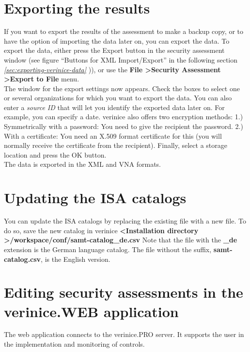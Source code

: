 \documentclass[a4paper,10pt]{book}
\begin{document}
\section{Exporting the results}
If you want to export the results of the assessment to make a backup copy, or to have the option of
importing the data later on, you can export the data. To export the data, either press the Export button
in the security assessment window (see figure ``Buttons for XML Import/Export'' in the following section {\em \ref{sec:exporting-verinice-data} })),
or use the \textbf{File \textgreater Security Assessment \textgreater Export to File} menu.
\newline\\
The window for the export settings now appears. Check the boxes to select one or several organizations
for which you want to export the data. You can also enter a \textit{source ID} that will let you identify the
exported data later on. For example, you can specify a date. verinice also offers two encryption methods: 1.)
Symmetrically with a password: You need to give the recipient the password. 2.) With a certificate: You
need an X.509 format certificate for this (you will normally receive the certificate from the recipient).
Finally, select a storage location and press the OK button.
\newline\\
The data is exported in the XML and VNA formats.

\section{Updating the ISA catalogs}
You can update the ISA catalogs by replacing the existing file with a new file. To do so, save the new catalog in verinice
\textbf{\textless Installation directory \textgreater/workspace/conf/samt-catalog\_de.csv}
Note that the file with the \textbf{\_de} extension is the German language catalog. The file without the suffix,
\textbf{samt-catalog.csv}, is the English version.

\section[Editing security assessments in the verinice.WEB
frontend]{Editing security assessments in the verinice.WEB
  application}
\label{sec:security-assessments-web-frontend}

The web application connects to the verinice.\textsc{PRO} server. It
supports the user in the implementation and monitoring of controls.
\end{document}

